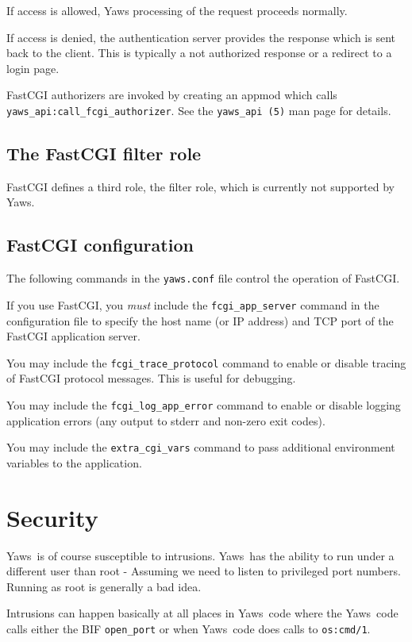 \documentclass[11pt,oneside,english]{book}
\newcommand{\Yaws}            %
        {{\sc Yaws}}
\begin{document}
If access is allowed, Yaws processing of the request proceeds
normally.

If access is denied, the authentication server provides the
response which is sent back to the client. This is typically
a not authorized response or a redirect to a login page.

FastCGI authorizers are invoked by creating an appmod which
calls \verb+yaws_api:call_fcgi_authorizer+.
See the \verb+yaws_api (5)+ man page for details.

\section{The FastCGI filter role}

FastCGI defines a third role, the filter role, which
is currently not supported by Yaws.


\section{FastCGI configuration}

The following commands in the \verb+yaws.conf+ file control the
operation of FastCGI.

If you use FastCGI, you \emph{must} include the \verb+fcgi_app_server+
command in the configuration file to specify the host name (or IP address)
and TCP port of the FastCGI application server.

You may include the \verb+fcgi_trace_protocol+ command to enable or disable
tracing of FastCGI protocol messages. This is useful for debugging.

You may include the \verb+fcgi_log_app_error+ command to enable or disable
logging application errors (any output to stderr and non-zero exit codes).

You may include the \verb+extra_cgi_vars+ command to pass additional
environment variables to the application.



\chapter{Security}

\Yaws\  is of course susceptible to intrusions. \Yaws\  has the
ability to run under a different user than root - Assuming we need
to listen to privileged port numbers. Running as root is generally a
bad idea.

Intrusions can happen basically at all places in \Yaws\  code where the
\Yaws\  code calls either the BIF \verb+open_port+ or when \Yaws\  code
does calls to \verb+os:cmd/1+.
\end{document}
